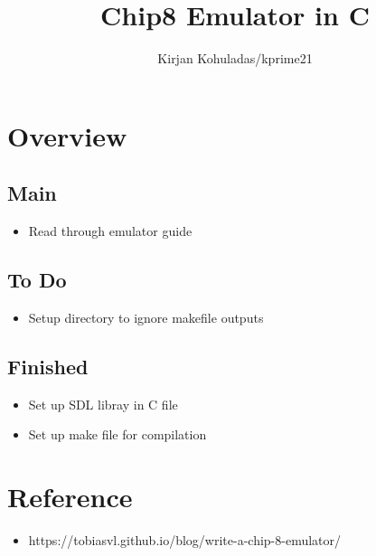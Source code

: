 \documentclass{article}
\title{\vspace{-7em} Chip8 Emulator in C}
\author{Kirjan Kohuladas/kprime21}
\date{}
\begin{document}
\maketitle


\section*{Overview}
\subsection*{Main}
\begin{itemize}
	\item Read through emulator guide
\end{itemize}
\subsection*{To Do}
\begin{itemize}
	\item Setup directory to ignore makefile outputs
\end{itemize}

\subsection*{Finished}
\begin{itemize}
	\item Set up SDL libray in C file
	\item Set up make file for compilation
\end{itemize}


\section*{Reference}
\begin{itemize}
	\item https://tobiasvl.github.io/blog/write-a-chip-8-emulator/
\end{itemize}
\end{document}
